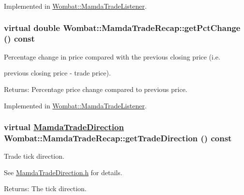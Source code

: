 Implemented in \hyperlink{classWombat_1_1MamdaTradeListener_f9dc99814388d51987fa19c1b13ff07d}{Wombat::Mamda\-Trade\-Listener}.\hypertarget{classWombat_1_1MamdaTradeRecap_05f9cfbfd50d3783a2d5716064ed7b9f}{
\subsubsection[getPctChange]{\setlength{\rightskip}{0pt plus 5cm}virtual double Wombat::Mamda\-Trade\-Recap::get\-Pct\-Change () const}}
\label{classWombat_1_1MamdaTradeRecap_05f9cfbfd50d3783a2d5716064ed7b9f}


Percentage change in price compared with the previous closing price (i.e. 

previous closing price - trade price).

\begin{Desc}
\item[Returns:]Percentage price change compared to previous price. \end{Desc}


Implemented in \hyperlink{classWombat_1_1MamdaTradeListener_a1d7053dbff245beccdd8357c72d662c}{Wombat::Mamda\-Trade\-Listener}.\hypertarget{classWombat_1_1MamdaTradeRecap_abbd87f4ea29275d32a78e20426cafca}{
\subsubsection[getTradeDirection]{\setlength{\rightskip}{0pt plus 5cm}virtual \hyperlink{namespaceWombat_d2479765bb418204c8ccfd3785d2bdbe}{Mamda\-Trade\-Direction} Wombat::Mamda\-Trade\-Recap::get\-Trade\-Direction () const}}
\label{classWombat_1_1MamdaTradeRecap_abbd87f4ea29275d32a78e20426cafca}


Trade tick direction. 

See \hyperlink{MamdaTradeDirection_8h}{Mamda\-Trade\-Direction.h} for details.

\begin{Desc}
\item[Returns:]The tick direction. \end{Desc}


